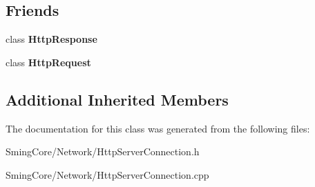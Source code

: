 \subsection*{Friends}
\begin{DoxyCompactItemize}
\item 
\hypertarget{class_http_server_connection_a48233feea8fcb70b62dd61a3bb860c9d}{}class {\bfseries Http\+Response}\label{class_http_server_connection_a48233feea8fcb70b62dd61a3bb860c9d}

\item 
\hypertarget{class_http_server_connection_a3158ef04d4a1177eb6a5e64d87a6801c}{}class {\bfseries Http\+Request}\label{class_http_server_connection_a3158ef04d4a1177eb6a5e64d87a6801c}

\end{DoxyCompactItemize}
\subsection*{Additional Inherited Members}


The documentation for this class was generated from the following files\+:\begin{DoxyCompactItemize}
\item 
Sming\+Core/\+Network/Http\+Server\+Connection.\+h\item 
Sming\+Core/\+Network/Http\+Server\+Connection.\+cpp\end{DoxyCompactItemize}
